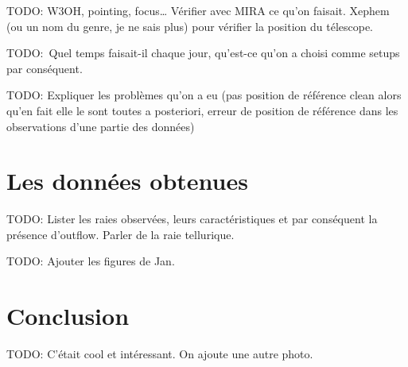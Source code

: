 \documentclass[a4paper,10pt,french]{article}
\begin{document}
TODO: W3OH, pointing, focus… Vérifier avec MIRA ce qu’on faisait. Xephem (ou un
nom du genre, je ne sais plus) pour vérifier la position du télescope.

TODO: Quel temps faisait-il chaque jour, qu’est-ce qu’on a choisi comme setups
par conséquent.

TODO: Expliquer les problèmes qu’on a eu (pas position de référence clean alors
qu’en fait elle le sont toutes a posteriori, erreur de position de référence
dans les observations d’une partie des données)

\section{Les données obtenues}

TODO: Lister les raies observées, leurs caractéristiques et par conséquent la
présence d’outflow. Parler de la raie tellurique.

TODO: Ajouter les figures de Jan.

\section*{Conclusion}

TODO: C’était cool et intéressant. On ajoute une autre photo.
\end{document}
